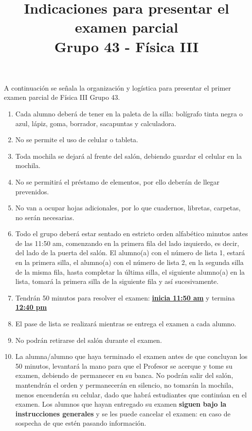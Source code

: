 \documentclass[14pt]{extarticle}
\title{\vspace*{-2cm} Indicaciones para presentar el examen parcial \\  Grupo 43 - Física III\vspace{-5ex}}
\date{}
\begin{document}
\maketitle

\large

A continuación se señala la organización y logística para presentar el primer examen parcial de Física III Grupo 43.

\begin{enumerate}
\item Cada alumno deberá de tener en la paleta de la silla: bolígrafo tinta negra o azul, lápiz, goma, borrador, sacapuntas y calculadora.
\item No se permite el uso de celular o tableta.
\item Toda mochila se dejará al frente del salón, debiendo guardar el celular en la mochila.
\item No se permitirá el préstamo de elementos, por ello deberán de llegar prevenidos.
\item No van a ocupar hojas adicionales, por lo que cuadernos, libretas, carpetas, no serán necesarias.
\item Todo el grupo deberá estar sentado en estricto orden alfabético minutos antes de las 11:50 am, comenzando en la primera fila del lado izquierdo, es decir, del lado de la puerta del salón. El alumno(a) con el número de lista 1, estará en la primera silla, el alumno(a) con el número de lista 2, en la segunda silla de la misma fila, hasta completar la última silla, el siguiente alumno(a) en la lista, tomará la primera silla de la siguiente fila y así sucesivamente.
\item Tendrán 50 minutos para resolver el examen: \textbf{\underline{inicia 11:50 am}} y termina \textbf{\underline{12:40 pm}}
\item El pase de lista se realizará mientras se entrega el examen a cada alumno.
\item No podrán retirarse del salón durante el examen.
\item La alumna/alumno que haya terminado el examen antes de que concluyan los 50 minutos, levantará la mano para que el Profesor se acerque y tome su examen, debiendo de permanecer en su banca. No podrán salir del salón, mantendrán el orden y permanecerán en silencio, no tomarán la mochila, menos encenderán su celular, dado que habrá estudiantes que continúan en el examen. Los alumnos que hayan entregado su examen \textbf{siguen bajo la instrucciones generales} y se les puede cancelar el examen: en caso de sospecha de que estén pasando información.

\end{enumerate}
\end{document}
